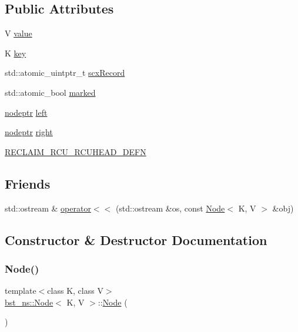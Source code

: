 \subsection*{Public Attributes}
\begin{DoxyCompactItemize}
\item 
V \hyperlink{classbst__ns_1_1Node_adb140ea18301e8c5c51a8083571c3632}{value}
\item 
K \hyperlink{classbst__ns_1_1Node_aab49c1b3b2ead5b79a4d259866c6570e}{key}
\item 
std\+::atomic\+\_\+uintptr\+\_\+t \hyperlink{classbst__ns_1_1Node_aa7416bc36b7f8eb297035d079a096e0f}{scx\+Record}
\item 
std\+::atomic\+\_\+bool \hyperlink{classbst__ns_1_1Node_a9802ddeb9977786cba3938bf515f4214}{marked}
\item 
\hyperlink{bst__rwlock__impl_8h_a04158d2a20768fe447133ff555823b05}{nodeptr} \hyperlink{classbst__ns_1_1Node_a5758be9af43bbba08e9ec0b53858dc2c}{left}
\item 
\hyperlink{bst__rwlock__impl_8h_a04158d2a20768fe447133ff555823b05}{nodeptr} \hyperlink{classbst__ns_1_1Node_a2b88528b93f10de2d57e70bc6a1efb8a}{right}
\item 
\hyperlink{classbst__ns_1_1Node_ab3a9c0980d092db36d0df8cb91d72de4}{R\+E\+C\+L\+A\+I\+M\+\_\+\+R\+C\+U\+\_\+\+R\+C\+U\+H\+E\+A\+D\+\_\+\+D\+E\+FN}
\end{DoxyCompactItemize}
\subsection*{Friends}
\begin{DoxyCompactItemize}
\item 
std\+::ostream \& \hyperlink{classbst__ns_1_1Node_a868b7fcd3b0bb864d505f6206b592dce}{operator$<$$<$} (std\+::ostream \&os, const \hyperlink{classbst__ns_1_1Node}{Node}$<$ K, V $>$ \&obj)
\end{DoxyCompactItemize}


\subsection{Constructor \& Destructor Documentation}
\mbox{\label{classbst__ns_1_1Node_a488f346ef3e9fffe5bedf994dbd87efb}} 
\subsubsection{\texorpdfstring{Node()}{Node()}\hspace{0.1cm}{\footnotesize\ttfamily [1/2]}}
{\footnotesize\ttfamily template$<$class K, class V$>$ \\
\hyperlink{classbst__ns_1_1Node}{bst\+\_\+ns\+::\+Node}$<$ K, V $>$\+::\hyperlink{classbst__ns_1_1Node}{Node} (\begin{DoxyParamCaption}{ }\end{DoxyParamCaption})\hspace{0.3cm}{\ttfamily [inline]}}


